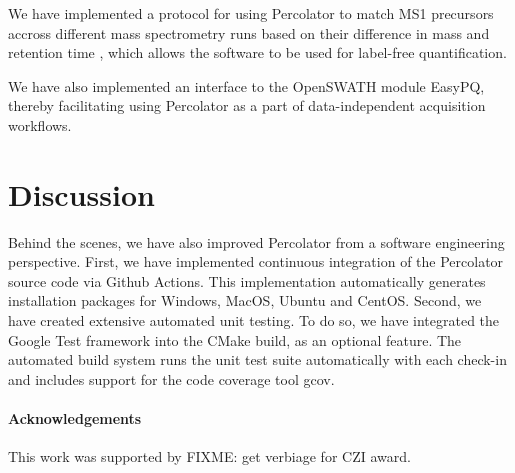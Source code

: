 \documentclass{article}
\newcommand{\fixme}[1]{\color{red}FIXME: #1\color{black}}
\begin{document}
We have implemented a protocol for using Percolator to match MS1 precursors accross different mass spectrometry runs based on their difference in mass and retention time \cite{the:focus}, which allows the software to be used for label-free quantification.

We have also implemented an interface to the OpenSWATH module EasyPQ, thereby facilitating using Percolator as a part of data-independent acquisition
workflows.

\section*{Discussion}

Behind the scenes, we have also improved Percolator from a software engineering perspective.
First, we have implemented continuous integration of the Percolator source code via Github Actions.
This implementation automatically generates installation packages for Windows, MacOS, Ubuntu and CentOS.
Second, we have created extensive automated unit testing.
To do so, we have integrated the Google Test framework into the CMake build, as an optional feature.
The automated build system runs the unit test suite automatically with each check-in and includes support for the code coverage tool gcov.

\paragraph{Acknowledgements}

This work was supported by \fixme{get verbiage for CZI award.}



\end{document}
